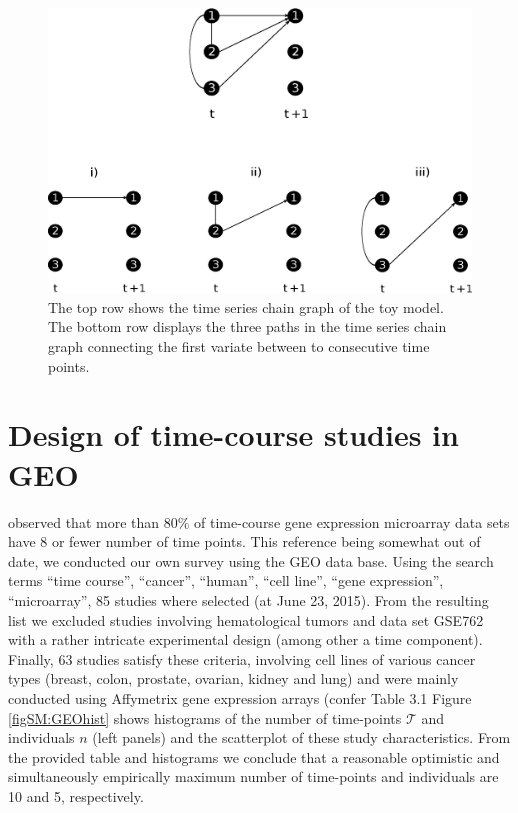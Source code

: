 \begin{figure}[b!]
\begin{center}
\includegraphics[angle=0, scale=0.5]{TSCG_pathExample2.eps}
\end{center}
\caption{The top row shows the time series chain graph of the toy model. The bottom row displays the three paths in the time series chain graph connecting the first variate between to consecutive time points.
\label{fig.TSCGpathAnalysis}}
\end{figure}



\newpage
\section{Design of time-course studies in GEO}
\cite{Ernst2005} observed that more than $80\%$ of time-course gene expression microarray data sets have 8 or fewer number of time points. This reference being somewhat out of date, we conducted our own survey using the GEO data base. Using the search terms ``time course'', ``cancer'', ``human'',  ``cell line'', ``gene expression'', ``microarray'', 85 studies where selected (at June 23, 2015). From the resulting list we excluded studies involving hematological tumors and data set GSE762 with a rather intricate experimental design (among other a time component). Finally, 63 studies satisfy these criteria, involving cell lines of various cancer types (breast, colon, prostate, ovarian, kidney and lung) and were mainly conducted using Affymetrix gene expression arrays (confer Table 3.1 Figure \ref{figSM:GEOhist} shows histograms of the number of time-points $\mathcal{T}$ and individuals $n$ (left panels) and the scatterplot of these study characteristics. From the provided table and histograms we conclude that a reasonable optimistic and simultaneously empirically maximum number of time-points and individuals are 10 and 5, respectively.
\\
\mbox{ }
\\
\mbox{ }
\\
\mbox{ }

